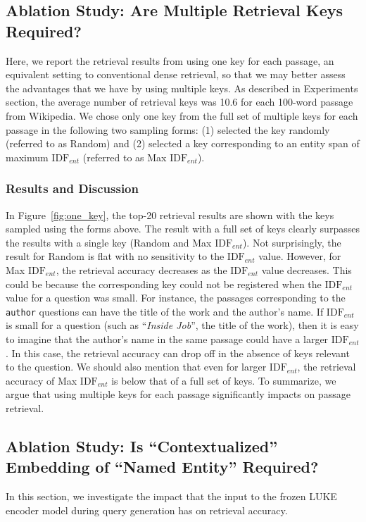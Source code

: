 \documentclass[letterpaper]{article} %
\begin{document}
\subsection{Ablation Study: Are Multiple Retrieval Keys Required?}\label{sec:ablation_multiple_keys}
Here, we report the retrieval results from using one key for each passage, an equivalent setting to conventional dense retrieval, so that we may better assess the advantages that we have by using multiple keys.
As described in Experiments section, the average number of retrieval keys was 10.6 for each 100-word passage from Wikipedia.
We chose only one key from the full set of multiple keys for each passage in the following two sampling forms:
(1) selected the key randomly (referred to as Random) and (2) selected a key corresponding to an entity span of maximum $\mathrm{IDF}_{ent}$ (referred to as Max $\mathrm{IDF}_{ent}$).

\subsubsection{Results and Discussion}
In Figure~\ref{fig:one_key}, the top-20 retrieval results are shown with the keys sampled using the forms above.
The result with a full set of keys clearly surpasses the results with a single key (Random and Max $\mathrm{IDF}_{ent}$).
Not surprisingly, the result for Random is flat with no sensitivity to the $\mathrm{IDF}_{ent}$ value.
However, for Max $\mathrm{IDF}_{ent}$, the retrieval accuracy decreases as the $\mathrm{IDF}_{ent}$ value decreases.
This could be because the corresponding key could not be registered when the $\mathrm{IDF}_{ent}$ value for a question was small.
For instance, the passages corresponding to the \texttt{\small author} questions can have the title of the work and the author's name.
If $\mathrm{IDF}_{ent}$ is small for a question (such as ``\textit{Inside Job}'', the title of the work), then it is easy to imagine that the author's name in the same passage could have a larger $\mathrm{IDF}_{ent}$.
In this case, the retrieval accuracy can drop off in the absence of keys relevant to the question.
We should also mention that even for larger $\mathrm{IDF}_{ent}$, the retrieval accuracy of Max $\mathrm{IDF}_{ent}$ is below that of a full set of keys.
To summarize, we argue that using multiple keys for each passage significantly impacts on passage retrieval.


\subsection{Ablation Study: Is ``Contextualized'' Embedding of ``Named Entity'' Required?}\label{sec:ablation_contextualized_embedding}
In this section, we investigate the impact that the input to the frozen LUKE encoder model during query generation has on retrieval accuracy.
\end{document}
